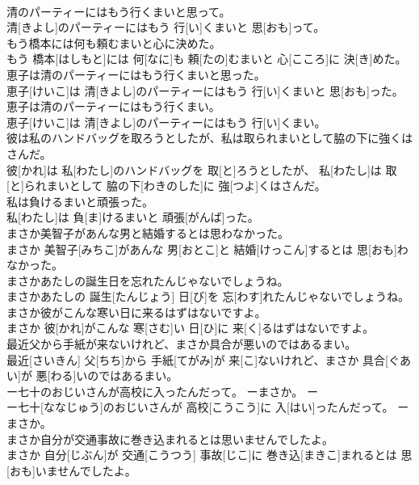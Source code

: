 \documentclass[8pt]{extreport}
\begin{document}
\begin{CJK}{UTF8}{min}
\\	清のパーティーにはもう行くまいと思って。	
\\	清[きよし]のパーティーにはもう 行[い]くまいと 思[おも]って。
\\	もう橋本には何も頼むまいと心に決めた。	
\\	もう 橋本[はしもと]には 何[なに]も 頼[たの]むまいと 心[こころ]に 決[き]めた。
\\	恵子は清のパーティーにはもう行くまいと思った。	
\\	恵子[けいこ]は 清[きよし]のパーティーにはもう 行[い]くまいと 思[おも]った。
\\	恵子は清のパーティーにはもう行くまい。	
\\	恵子[けいこ]は 清[きよし]のパーティーにはもう 行[い]くまい。
\\	彼は私のハンドバッグを取ろうとしたが、私は取られまいとして脇の下に強くはさんだ。	
\\	彼[かれ]は 私[わたし]のハンドバッグを 取[と]ろうとしたが、 私[わたし]は 取[と]られまいとして 脇の下[わきのした]に 強[つよ]くはさんだ。
\\	私は負けるまいと頑張った。	
\\	私[わたし]は 負[ま]けるまいと 頑張[がんば]った。
\\	まさか美智子があんな男と結婚するとは思わなかった。	
\\	まさか 美智子[みちこ]があんな 男[おとこ]と 結婚[けっこん]するとは 思[おも]わなかった。
\\	まさかあたしの誕生日を忘れたんじゃないでしょうね。	
\\	まさかあたしの 誕生[たんじょう] 日[び]を 忘[わす]れたんじゃないでしょうね。
\\	まさか彼がこんな寒い日に来るはずはないですよ。	
\\	まさか 彼[かれ]がこんな 寒[さむ]い 日[ひ]に 来[く]るはずはないですよ。
\\	最近父から手紙が来ないけれど、まさか具合が悪いのではあるまい。	
\\	最近[さいきん] 父[ちち]から 手紙[てがみ]が 来[こ]ないけれど、まさか 具合[ぐあい]が 悪[わる]いのではあるまい。
\\	ー七十のおじいさんが高校に入ったんだって。 ーまさか。	ー
\\	ー七十[ななじゅう]のおじいさんが 高校[こうこう]に 入[はい]ったんだって。 ーまさか。
\\	まさか自分が交通事故に巻き込まれるとは思いませんでしたよ。	
\\	まさか 自分[じぶん]が 交通[こうつう] 事故[じこ]に 巻き込[まきこ]まれるとは 思[おも]いませんでしたよ。

\end{CJK}
\end{document}
